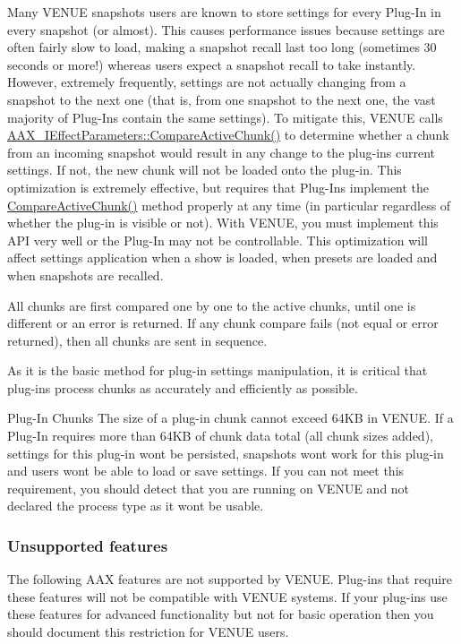  Many V\+E\+N\+UE snapshots users are known to store settings for every Plug-\/\+In in every snapshot (or almost). This causes performance issues because settings are often fairly slow to load, making a snapshot recall last too long (sometimes 30 seconds or more!) whereas users expect a snapshot recall to take instantly. However, extremely frequently, settings are not actually changing from a snapshot to the next one (that is, from one snapshot to the next one, the vast majority of Plug-\/\+Ins contain the same settings). To mitigate this, V\+E\+N\+UE calls \mbox{\hyperlink{a01669_a1e86f849e970c9998313fc7d451ccf85}{A\+A\+X\+\_\+\+I\+Effect\+Parameters\+::\+Compare\+Active\+Chunk()}} to determine whether a chunk from an incoming snapshot would result in any change to the plug-\/in\textquotesingle{}s current settings. If not, the new chunk will not be loaded onto the plug-\/in. This optimization is extremely effective, but requires that Plug-\/\+Ins implement the \mbox{\hyperlink{a01669_a1e86f849e970c9998313fc7d451ccf85}{Compare\+Active\+Chunk()}} method properly at any time (in particular regardless of whether the plug-\/in is visible or not). With V\+E\+N\+UE, you must implement this A\+PI very well or the Plug-\/\+In may not be controllable. This optimization will affect settings application when a show is loaded, when presets are loaded and when snapshots are recalled.

 All chunks are first compared one by one to the active chunks, until one is different or an error is returned. If any chunk compare fails (not equal or error returned), then all chunks are sent in sequence.

 As it is the basic method for plug-\/in settings manipulation, it is critical that plug-\/ins process chunks as accurately and efficiently as possible.

 Plug-\/\+In Chunks The size of a plug-\/in chunk cannot exceed 64KB in V\+E\+N\+UE. If a Plug-\/\+In requires more than 64KB of chunk data total (all chunk sizes added), settings for this plug-\/in won\textquotesingle{}t be persisted, snapshots won\textquotesingle{}t work for this plug-\/in and users won\textquotesingle{}t be able to load or save settings. If you can not meet this requirement, you should detect that you are running on V\+E\+N\+UE and not declared the process type as it won\textquotesingle{}t be usable.

\hypertarget{a00849_subsection__aax_venue_guide__features__unsupported}{}\subsubsection{Unsupported features}\label{a00849_subsection__aax_venue_guide__features__unsupported}
 The following A\+AX features are not supported by V\+E\+N\+UE. Plug-\/ins that require these features will not be compatible with V\+E\+N\+UE systems. If your plug-\/ins use these features for advanced functionality but not for basic operation then you should document this restriction for V\+E\+N\+UE users.

